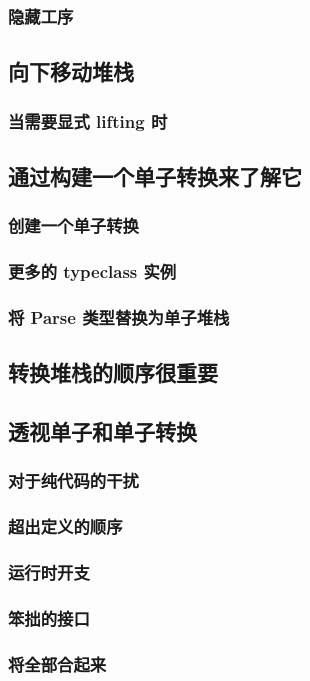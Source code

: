 \documentclass[./main.tex]{subfiles}
\begin{document}
\subsubsection*{隐藏工序}

\subsection*{向下移动堆栈}

\subsubsection*{当需要显式 lifting 时}

\subsection*{通过构建一个单子转换来了解它}

\subsubsection*{创建一个单子转换}
\subsubsection*{更多的 typeclass 实例}

\subsubsection*{将 Parse 类型替换为单子堆栈}

\subsection*{转换堆栈的顺序很重要}

\subsection*{透视单子和单子转换}

\subsubsection*{对于纯代码的干扰}

\subsubsection*{超出定义的顺序}

\subsubsection*{运行时开支}

\subsubsection*{笨拙的接口}

\subsubsection*{将全部合起来}
\end{document}
